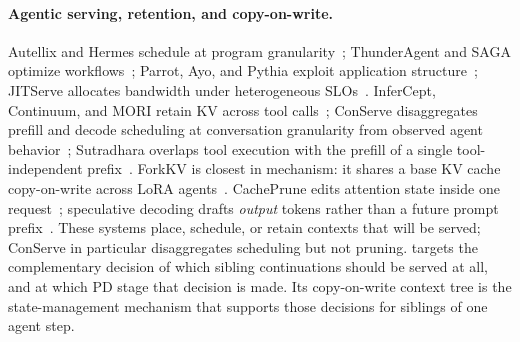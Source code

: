 \paragraph{Agentic serving, retention, and copy-on-write.}
Autellix and Hermes schedule at program granularity~\cite{autellix,hermes}; ThunderAgent and SAGA optimize workflows~\cite{thunderagent,saga}; Parrot, Ayo, and Pythia exploit application structure~\cite{parrot,ayo,pythia}; JITServe allocates bandwidth under heterogeneous SLOs~\cite{jitserve}.
InferCept, Continuum, and MORI retain KV across tool calls~\cite{infercept,continuum,mori}; ConServe disaggregates prefill and decode scheduling at conversation granularity from observed agent behavior~\cite{conserve}; Sutradhara overlaps tool execution with the prefill of a single tool-independent prefix~\cite{sutradhara}.
ForkKV is closest in mechanism: it shares a base KV cache copy-on-write across LoRA agents~\cite{forkkv}.
CachePrune edits attention state inside one request~\cite{cacheprune}; speculative decoding drafts \emph{output} tokens rather than a future prompt prefix~\cite{speculative,medusa,eagledraft}.
These systems place, schedule, or retain contexts that will be served; ConServe in particular disaggregates scheduling but not pruning.
\sys targets the complementary decision of which sibling continuations should be served at all, and at which PD stage that decision is made.
Its copy-on-write context tree is the state-management mechanism that supports those decisions for siblings of one agent step.

